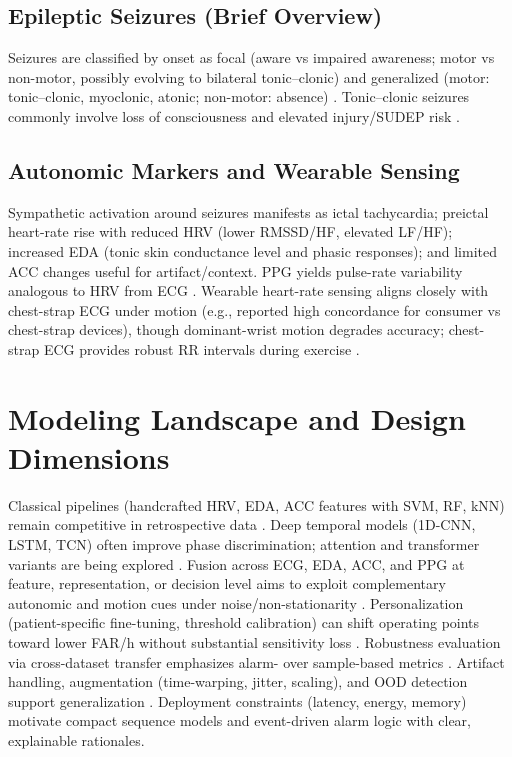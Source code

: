 \subsection{Epileptic Seizures (Brief Overview)}
Seizures are classified by onset as focal (aware vs impaired awareness;
motor vs non-motor, possibly evolving to bilateral tonic--clonic) and
generalized (motor: tonic--clonic, myoclonic, atonic; non-motor:
absence) \parencite{fisherInstructionManualILAE2017}. Tonic--clonic
seizures commonly involve loss of consciousness and elevated
injury/SUDEP risk \parencite{hesdorfferCombinedAnalysisRisk2011}.

\subsection{Autonomic Markers and Wearable Sensing}
Sympathetic activation around seizures manifests as ictal tachycardia;
preictal heart-rate rise with reduced HRV (lower RMSSD/HF, elevated
LF/HF); increased EDA (tonic skin conductance level and phasic
responses); and limited ACC changes useful for artifact/context. PPG
yields pulse-rate variability analogous to HRV from ECG
\parencite{mironAutonomicBiosignalsSeizure2025,masonHeartRateVariability2024}.
Wearable heart-rate sensing aligns closely with chest-strap ECG under
motion (e.g., reported high concordance for consumer vs chest-strap
devices), though dominant-wrist motion degrades accuracy; chest-strap
ECG provides robust RR intervals during exercise
\parencite{wolfHearttoWearAssessingAccuracy2024a}.

\section{Modeling Landscape and Design Dimensions}
Classical pipelines (handcrafted HRV, EDA, ACC features with SVM, RF,
kNN) remain competitive in retrospective data
\parencite{sethFeasibilityCardiacbasedSeizure2023,masonHeartRateVariability2024}.
Deep temporal models (1D-CNN, LSTM, TCN) often improve phase
discrimination; attention and transformer variants are being explored
\parencite{yangMultimodalAISystem2022,pordoyEnhancedNonEEGMultimodal2025,abtahiIdentificationRelevantECG2025,kalousiosECGbasedEpilepticSeizure2024}.
Fusion across ECG, EDA, ACC, and PPG at feature, representation, or
decision level aims to exploit complementary autonomic and motion cues
under noise/non-stationarity \parencite{yangMultimodalAISystem2022,pordoyEnhancedNonEEGMultimodal2025}.
Personalization (patient-specific fine-tuning, threshold calibration)
can shift operating points toward lower FAR/h without substantial
sensitivity loss \parencite{andradePerformanceSeizurePrediction2024}.
Robustness evaluation via cross-dataset transfer emphasizes alarm-
over sample-based metrics \parencite{yangMultimodalAISystem2022,andradePerformanceSeizurePrediction2024}.
Artifact handling, augmentation (time-warping, jitter, scaling), and
OOD detection support generalization
\parencite{kalousiosECGbasedEpilepticSeizure2024,sethFeasibilityCardiacbasedSeizure2023}.
Deployment constraints (latency, energy, memory) motivate compact
sequence models and event-driven alarm logic with clear, explainable
rationales.

